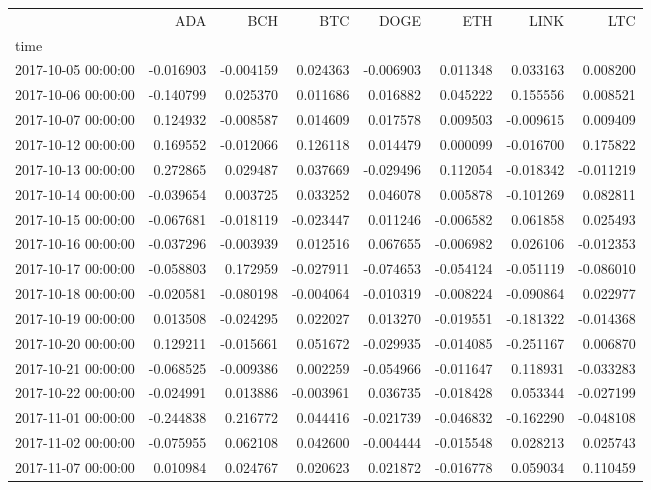 \begin{tabular}{lrrrrrrr}
\toprule
 & ADA & BCH & BTC & DOGE & ETH & LINK & LTC \\
time &  &  &  &  &  &  &  \\
\midrule
2017-10-05 00:00:00 & -0.016903 & -0.004159 & 0.024363 & -0.006903 & 0.011348 & 0.033163 & 0.008200 \\
2017-10-06 00:00:00 & -0.140799 & 0.025370 & 0.011686 & 0.016882 & 0.045222 & 0.155556 & 0.008521 \\
2017-10-07 00:00:00 & 0.124932 & -0.008587 & 0.014609 & 0.017578 & 0.009503 & -0.009615 & 0.009409 \\
2017-10-12 00:00:00 & 0.169552 & -0.012066 & 0.126118 & 0.014479 & 0.000099 & -0.016700 & 0.175822 \\
2017-10-13 00:00:00 & 0.272865 & 0.029487 & 0.037669 & -0.029496 & 0.112054 & -0.018342 & -0.011219 \\
2017-10-14 00:00:00 & -0.039654 & 0.003725 & 0.033252 & 0.046078 & 0.005878 & -0.101269 & 0.082811 \\
2017-10-15 00:00:00 & -0.067681 & -0.018119 & -0.023447 & 0.011246 & -0.006582 & 0.061858 & 0.025493 \\
2017-10-16 00:00:00 & -0.037296 & -0.003939 & 0.012516 & 0.067655 & -0.006982 & 0.026106 & -0.012353 \\
2017-10-17 00:00:00 & -0.058803 & 0.172959 & -0.027911 & -0.074653 & -0.054124 & -0.051119 & -0.086010 \\
2017-10-18 00:00:00 & -0.020581 & -0.080198 & -0.004064 & -0.010319 & -0.008224 & -0.090864 & 0.022977 \\
2017-10-19 00:00:00 & 0.013508 & -0.024295 & 0.022027 & 0.013270 & -0.019551 & -0.181322 & -0.014368 \\
2017-10-20 00:00:00 & 0.129211 & -0.015661 & 0.051672 & -0.029935 & -0.014085 & -0.251167 & 0.006870 \\
2017-10-21 00:00:00 & -0.068525 & -0.009386 & 0.002259 & -0.054966 & -0.011647 & 0.118931 & -0.033283 \\
2017-10-22 00:00:00 & -0.024991 & 0.013886 & -0.003961 & 0.036735 & -0.018428 & 0.053344 & -0.027199 \\
2017-11-01 00:00:00 & -0.244838 & 0.216772 & 0.044416 & -0.021739 & -0.046832 & -0.162290 & -0.048108 \\
2017-11-02 00:00:00 & -0.075955 & 0.062108 & 0.042600 & -0.004444 & -0.015548 & 0.028213 & 0.025743 \\
2017-11-07 00:00:00 & 0.010984 & 0.024767 & 0.020623 & 0.021872 & -0.016778 & 0.059034 & 0.110459 \\

\end{tabular}
